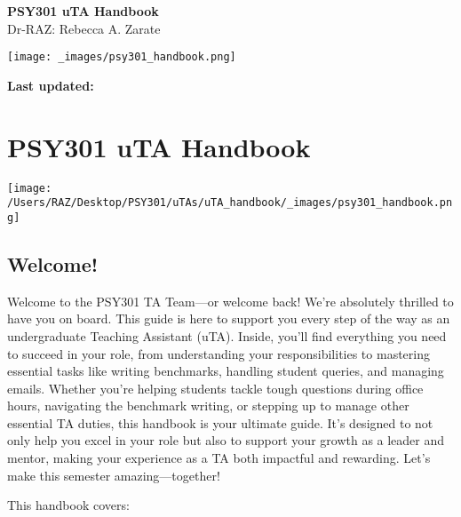 \documentclass[
]{article}
\author{}
\date{\vspace{-2.5em}}
\begin{document}
\begin{titlepage}
\begin{center}
\vspace*{3cm}

{\Huge \textbf{PSY301 uTA Handbook}}\\[1cm]
{\Large Dr-RAZ: Rebecca A. Zarate}\\[2cm]

\vfill

\texttt{[image: \_images/psy301\_handbook.png]}

\vfill

\textbf{Last updated:} \the\year \\[1cm]

\end{center}
\end{titlepage}


{
\setcounter{tocdepth}{2}
\tableofcontents
}
\hypertarget{psy301-uta-handbook}{%
\section{PSY301 uTA Handbook}\label{psy301-uta-handbook}}

\texttt{[image: /Users/RAZ/Desktop/PSY301/uTAs/uTA\_handbook/\_images/psy301\_handbook.png]}

\hypertarget{welcome}{%
\subsection*{Welcome!}\label{welcome}}

Welcome to the PSY301 TA Team---or welcome back! We're absolutely thrilled to have you on board. This guide is here to support you every step of the way as an undergraduate Teaching Assistant (uTA). Inside, you'll find everything you need to succeed in your role, from understanding your responsibilities to mastering essential tasks like writing benchmarks, handling student queries, and managing emails. Whether you're helping students tackle tough questions during office hours, navigating the benchmark writing, or stepping up to manage other essential TA duties, this handbook is your ultimate guide. It's designed to not only help you excel in your role but also to support your growth as a leader and mentor, making your experience as a TA both impactful and rewarding. Let's make this semester amazing---together!

This handbook covers:
\end{document}
